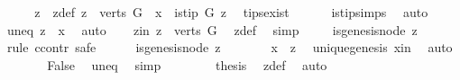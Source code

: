 \begin{isabellebody}
\ \ \isamarkupfalse%
\ \isamarkupfalse%
\ z\ \ z{\isacharunderscore}{\kern0pt}def{\isacharcolon}{\kern0pt}\ {\isachardoublequoteopen}z\ {\isasymin}\ {\isacharparenleft}{\kern0pt}verts\ G{\isacharparenright}{\kern0pt}\ {\isacharminus}{\kern0pt}\ {\isacharbraceleft}{\kern0pt}x{\isacharbraceright}{\kern0pt}\ {\isasymand}\ is{\isacharunderscore}{\kern0pt}tip\ G\ z{\isachardoublequoteclose}\ \isamarkupfalse%
\ tips{\isacharunderscore}{\kern0pt}exist\isanewline
\ \ \ \ \ \ is{\isacharunderscore}{\kern0pt}tip{\isachardot}{\kern0pt}simps\ \isamarkupfalse%
\ auto\isanewline
\ \ \isamarkupfalse%
\ \isamarkupfalse%
\ uneq{\isacharcolon}{\kern0pt}\ {\isachardoublequoteopen}z\ {\isasymnoteq}\ x{\isachardoublequoteclose}\ \isamarkupfalse%
\ auto\isanewline
\ \ \isamarkupfalse%
\ z{\isacharunderscore}{\kern0pt}in{\isacharcolon}{\kern0pt}\ {\isachardoublequoteopen}z\ {\isasymin}\ verts\ G{\isachardoublequoteclose}\ \isamarkupfalse%
\ z{\isacharunderscore}{\kern0pt}def\ \isamarkupfalse%
\ simp\isanewline
\ \ \isamarkupfalse%
\ {\isachardoublequoteopen}{\isasymnot}\ is{\isacharunderscore}{\kern0pt}genesis{\isacharunderscore}{\kern0pt}node\ z{\isachardoublequoteclose}\isanewline
\ \ \isamarkupfalse%
\ {\isacharparenleft}{\kern0pt}rule\ ccontr{\isacharcomma}{\kern0pt}\ safe{\isacharparenright}{\kern0pt}\isanewline
\ \ \ \ \isamarkupfalse%
\ {\isachardoublequoteopen}is{\isacharunderscore}{\kern0pt}genesis{\isacharunderscore}{\kern0pt}node\ z{\isachardoublequoteclose}\isanewline
\ \ \ \ \isamarkupfalse%
\ \isamarkupfalse%
\ {\isachardoublequoteopen}x\ {\isacharequal}{\kern0pt}\ z{\isachardoublequoteclose}\ \isamarkupfalse%
\ unique{\isacharunderscore}{\kern0pt}genesis\ x{\isacharunderscore}{\kern0pt}in\ \isamarkupfalse%
\ auto\isanewline
\ \ \ \ \isamarkupfalse%
\ \isamarkupfalse%
\ False\ \isamarkupfalse%
\ uneq\ \isamarkupfalse%
\ simp\isanewline
\ \ \isamarkupfalse%
\isanewline
\ \ \isamarkupfalse%
\ \isamarkupfalse%
\ {\isachardoublequoteopen}{\isacharquery}{\kern0pt}thesis{\isachardoublequoteclose}\ \isamarkupfalse%
\ z{\isacharunderscore}{\kern0pt}def\ \isamarkupfalse%
\ auto\isanewline
{}\isamarkupfalse%
%

\end{isabellebody}
